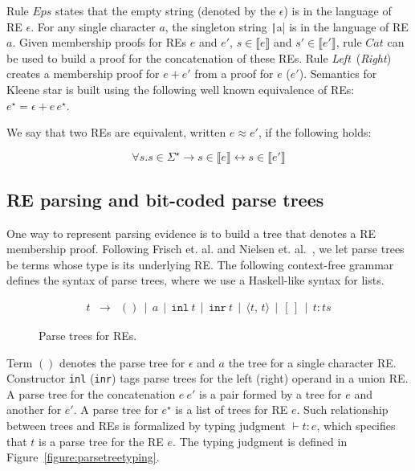 \documentclass[review]{elsarticle}
\newcommand{\Eps}{\textit{Eps}}
\newcommand{\Catt}{\textit{Cat}}
\newcommand{\Left}{\textit{Left}}
\newcommand{\Right}{\textit{Right}}
\newcommand{\sembrackets}[1]{\ensuremath{\llbracket #1 \rrbracket}}
\newcommand{\coq}[1]{\texttt|#1|}
\theoremstyle{definition}
\begin{document}
Rule $\Eps$ states that the empty string (denoted by the $\epsilon$)
is in the language of RE $\epsilon$. For any single character $a$, the singleton
string \coq{a} is in the language 
of RE $a$. Given membership proofs for REs $e$ and $e'$, $s \in \sembrackets{e}$ 
and $s' \in\sembrackets{e'}$, rule $\Catt$ can be used to build a proof
for the concatenation of these REs.  Rule \Left~(\Right) creates a membership proof
for $e + e'$ from a proof for $e$ ($e'$). Semantics for Kleene star
is built using the following well known equivalence of REs: $e^\star
= \epsilon + e\,e^\star$. 

We say that two REs are equivalent, written $e\approx e'$, if the following holds:

\[
\forall s. s\in \Sigma^\star \to s \in\sembrackets{e} \leftrightarrow s\in\sembrackets{e'} 
\]


\subsection{RE parsing and bit-coded parse trees}\label{subsection:bitcodedparsetrees}

One way to represent parsing evidence is to build a tree that denotes
a RE membership proof. Following Frisch et. al. and Nielsen et.
al.~\cite{Lasse2011,Frisch2004},
we let parse trees be terms whose type is its underlying RE. The following context-free 
grammar defines the syntax of parse trees, where we use a Haskell-like syntax for 
lists.

\begin{figure}[h]
   \[
      \begin{array}{lcl}
         t & \to & () \,\mid\, a \,\mid\, \texttt{inl}\:t  \,\mid\, \texttt{inr}\:t  \,\mid\, \langle t,\,t\rangle  \,\mid\, [\,]\,\mid\,t : ts
      \end{array}
   \]
   \caption{Parse trees for REs.}
   \label{figure:parsetreesyntax}
\end{figure}

Term $()$ denotes the parse tree for $\epsilon$ and $a$ the tree for a single character RE. 
Constructor \texttt{inl} (\texttt{inr}) tags parse trees for the left (right) operand in 
a union RE. A parse tree for the concatenation $e\:e'$ is a pair formed by a tree for $e$ and 
another for $e'$. A parse tree for $e^\star$ is a list of trees for RE $e$. Such relationship 
between trees and REs is formalized by typing judgment $\vdash t : e$, which specifies that 
$t$ is a parse tree for the RE $e$. The typing judgment is defined in Figure~\ref{figure:parsetreetyping}.
\end{document}
